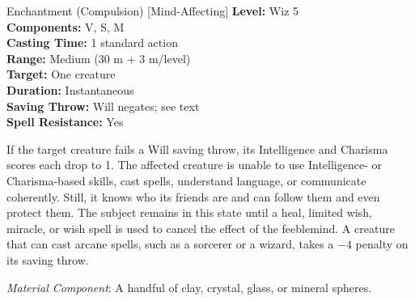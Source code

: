 {Enchantment (Compulsion) [Mind-Affecting]}
{
	\textbf{Level:}
	Wiz 5\\
	\textbf{Components:}
	V, S, M\\
	\textbf{Casting Time:}
	1 standard action\\
	\textbf{Range:}
	Medium (30 m + 3 m/level)\\
	\textbf{Target:}
	One creature\\
	\textbf{Duration:}
	Instantaneous\\
	\textbf{Saving Throw:}
	Will negates; see text\\
	\textbf{Spell Resistance:}
	Yes\\
}
{
	If the target creature fails a Will saving throw, its Intelligence and Charisma scores each drop to 1. The affected creature is unable to use Intelligence- or Charisma-based skills, cast spells, understand language, or communicate coherently. Still, it knows who its friends are and can follow them and even protect them. The subject remains in this state until a heal, limited wish, miracle, or wish spell is used to cancel the effect of the feeblemind. A creature that can cast arcane spells, such as a sorcerer or a wizard, takes a $-4$ penalty on its saving throw.

	\textit{Material Component}:
	A handful of clay, crystal, glass, or mineral spheres.

}
